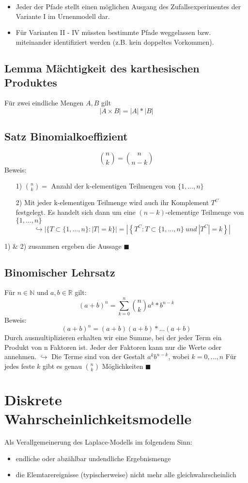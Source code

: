 \documentclass[12pt,a4paper]{article}
\begin{document}
\newpage
	\begin{itemize}
		\item Jeder der Pfade stellt einen möglichen Ausgang des Zufallsexperimentes der Variante I im 
		Urnenmodell dar.
		\item Für Varianten II - IV müssten bestimmte Pfade weggelassen bzw. miteinander identifiziert
		werden (z.B. kein doppeltes Vorkommen).
	\end{itemize}
	\subsection{Lemma Mächtigkeit des karthesischen Produktes}
	Für zwei eindliche Mengen $A,B$ gilt
	$$|A\times B| = |A|*|B|$$
	\subsection{Satz Binomialkoeffizient}
	$$\binom{n}{k}=\binom{n}{n-k}$$
	Beweis: 
	\begin{itemize}
		\item[1) ] $\binom{n}{k}=$ Anzahl der k-elementigen Teilmengen von $\{1,...,n\}$
		\item[2) ] Mit jeder k-elementigen Teilmenge wird auch ihr Komplement $T^C$ festgelegt. Es handelt sich 
		dann um eine $(n-k)$-elementige Teilmenge von $\{1,...,n\}$
		$$\hookrightarrow |\{T\subset\{1,...,n\}:|T|=k\}|=
		|\left\{T^C:T\subset\{1,...,n\}\: und \: |T^C|=k\right\}|$$		
	\end{itemize}
	1) \& 2) zusammen ergeben die Aussage $\blacksquare$
	\subsection{Binomischer Lehrsatz}
	Für $n\in\mathbb{N}$ und $a,b\in\mathbb{R}$ gilt:
	$$(a+b)^n=\sum_{k=0}^n \binom{n}{k}a^k*b^{n-k}$$
	Beweis:
	$$(a+b)^n=(a+b)(a+b)*...(a+b)$$
	Durch ausmultiplizieren erhalten wir eine Summe, bei der jeder Term ein Produkt von n Faktoren ist. Jeder
	der Faktoren kann nur die Werte  oder  annehmen. \newline
	$\hookrightarrow$ Die Terme sind von der Gestalt $a^k b^{n-k}$, wobei $k=0,...,n$
	Für jedes feste $k$ gibt es genau $\binom{n}{k}$ Möglichkeiten $\blacksquare$
\newpage
\section{Diskrete Wahrscheinlichkeitsmodelle}
	Als Verallgemeinerung des Laplace-Modells im folgendem Sinn:
	\begin{itemize}
		\item endliche oder abzählbar undendliche Ergebnismenge
		\item die Elemtarereignisse (typischerweise) nicht mehr alle \newline 
		gleichwahrscheinlich
	\end{itemize}
\end{document}
